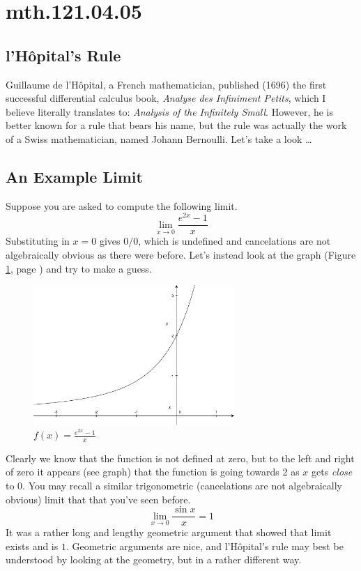 \documentclass[12pt,addpoints, answers, fleqn]{exam}
\begin{document}
\section{mth.121.04.05}

\subsection{l'H\^{o}pital's Rule}

Guillaume de l'H\^{o}pital, a French mathematician, published (1696) the first successful differential calculus book, \emph{Analyse des Infiniment Petits}, which I believe literally translates to: \emph{Analysis of the Infinitely Small}. However, he is better known for a rule that bears his name, but the rule was actually the work of a Swiss mathematician, named Johann Bernoulli. Let's take a look \ldots

\subsection{An Example Limit}

Suppose you are asked to compute the following limit.
\[
\mathop {\lim }\limits_{ x \to 0} \frac{e^{2x} - 1}{x}
\]
Substituting in $x=0$ gives $0/0$, which is undefined and cancelations are not algebraically obvious as there were before. Let's instead look at the graph (Figure \ref{fig:graph2201}, page \pageref{fig:graph2201}) and try to make a guess.
\begin{figure}[htbp] %
   \centering
   \includegraphics[width=3in]{./graphics/graph2201.pdf} 
   \caption{$\displaystyle f\left(x\right) = \frac{e^{2x} - 1}{x}$}
   \label{fig:graph2201}
\end{figure}
Clearly we know that the function is not defined at zero, but to the left and right of zero it appears (see graph) that the function is going towards 2 as $x$ gets \emph{close} to $0$. You may recall a similar trigonometric (cancelations are not algebraically obvious) limit that that you've seen before.
\[
\mathop {\lim }\limits_{ x \to 0} \frac{\sin x}{x} = 1
\]
It was a rather long and lengthy geometric argument that showed that limit exists and is $1$. Geometric arguments are nice, and l'H\^{o}pital's rule may best be understood by looking at the geometry, but in a rather different way.
\end{document}
